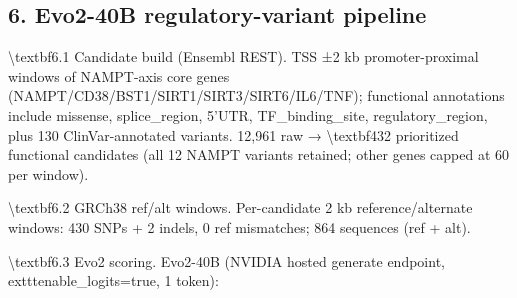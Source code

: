 \documentclass[11pt]{article}
\begin{document}
\subsection*{6. Evo2-40B regulatory-variant pipeline}
\textbackslash{}textbf{6.1 Candidate build (Ensembl REST).} TSS ±2 kb promoter-proximal windows of NAMPT-axis core genes (NAMPT/CD38/BST1/SIRT1/SIRT3/SIRT6/IL6/TNF); functional annotations include missense, splice\_region, 5'UTR, TF\_binding\_site, regulatory\_region, plus 130 ClinVar-annotated variants. 12,961 raw → \textbackslash{}textbf{432 prioritized functional candidates} (all 12 NAMPT variants retained; other genes capped at 60 per window).

\textbackslash{}textbf{6.2 GRCh38 ref/alt windows.} Per-candidate 2 kb reference/alternate windows: 430 SNPs + 2 indels, 0 ref mismatches; 864 sequences (ref + alt).

\textbackslash{}textbf{6.3 Evo2 scoring.} Evo2-40B (NVIDIA hosted generate endpoint, 	exttt{enable\_logits=true}, 1 token):
\end{document}
